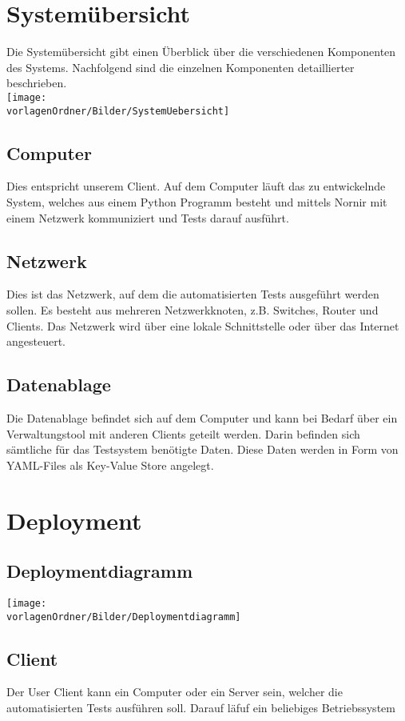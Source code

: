 \documentclass[
	ngerman,
	toc=listof, %
	toc=bibliography, %
	footnotes=multiple, %
	parskip=half, %
	numbers=noendperiod %
]{scrartcl}
\newcommand{\vorlagenOrdner}{../../99_Vorlagen} %
\begin{document}
\section{Systemübersicht}
	Die Systemübersicht gibt einen Überblick über die verschiedenen Komponenten des Systems. Nachfolgend sind die einzelnen Komponenten detaillierter beschrieben.\\
	\texttt{[image: \\vorlagenOrdner/Bilder/SystemUebersicht]}

	\subsection{Computer}
		Dies entspricht unserem Client.
		Auf dem Computer läuft das zu entwickelnde System, welches aus einem Python Programm besteht und mittels Nornir mit einem Netzwerk kommuniziert und Tests darauf ausführt.

	\subsection{Netzwerk}
		Dies ist das Netzwerk, auf dem die automatisierten Tests ausgeführt werden sollen. 
		Es besteht aus mehreren Netzwerkknoten, z.B. Switches, Router und Clients.
		Das Netzwerk wird über eine lokale Schnittstelle oder über das Internet angesteuert.

	\subsection{Datenablage}
		Die Datenablage befindet sich auf dem Computer und kann bei Bedarf über ein Verwaltungstool mit anderen Clients geteilt werden. 
		Darin befinden sich sämtliche für das Testsystem benötigte Daten.
		Diese Daten werden in Form von YAML-Files als Key-Value Store angelegt.

\section{Deployment}
	\subsection{Deploymentdiagramm}
		\texttt{[image: \\vorlagenOrdner/Bilder/Deploymentdiagramm]}
	
		\subsection{Client}
		Der User Client kann ein Computer oder ein Server sein, welcher die automatisierten Tests ausführen soll.
		Darauf läfuf ein beliebiges Betriebssystem
\end{document}
